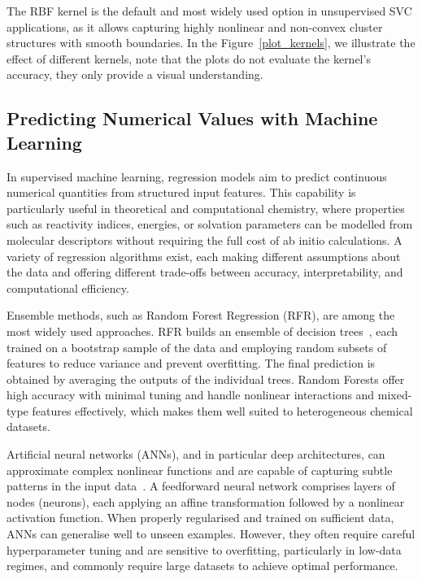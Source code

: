 The RBF kernel is the default and most widely used option in unsupervised SVC
applications, as it allows capturing highly nonlinear and non-convex cluster
structures with smooth boundaries. In the Figure~\ref{plot_kernels}, we
illustrate the effect of different kernels, note that the plots do not evaluate
the kernel's accuracy, they only provide a visual understanding.

\subsection{Predicting Numerical Values with Machine Learning}

In supervised machine learning, regression models aim to predict continuous
numerical quantities from structured input features. This capability is
particularly useful in theoretical and computational chemistry, where
properties such as reactivity indices, energies, or solvation parameters can be
modelled from molecular descriptors without requiring the full cost of ab
initio calculations. A variety of regression algorithms exist, each making
different assumptions about the data and offering different trade-offs between
accuracy, interpretability, and computational efficiency.

Ensemble methods, such as Random Forest Regression (RFR), are among the most
widely used approaches. RFR builds an ensemble of
decision trees~\cite{Breiman2001}, each trained on a bootstrap sample of the
data and employing random subsets of features to reduce variance and prevent
overfitting. The final prediction is obtained by averaging the outputs of the
individual trees. Random Forests offer high accuracy with minimal tuning and
handle nonlinear interactions and mixed-type features effectively, which makes
them well suited to heterogeneous chemical datasets.

Artificial neural networks (ANNs), and in particular deep architectures, can
approximate complex nonlinear functions and are capable of capturing subtle
patterns in the input data~\cite{Goodfellow2016}. A feedforward neural network
comprises layers of nodes (neurons), each applying an affine transformation
followed by a nonlinear activation function. When properly regularised and
trained on sufficient data, ANNs can generalise well to unseen examples.
However, they often require careful hyperparameter tuning and are sensitive to
overfitting, particularly in low-data regimes, and commonly require large
datasets to achieve optimal performance.

